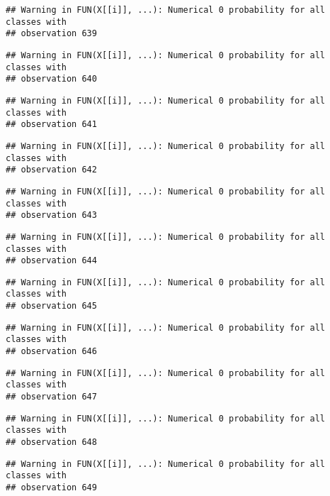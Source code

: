 \documentclass[
]{article}
\begin{document}
\begin{verbatim}
## Warning in FUN(X[[i]], ...): Numerical 0 probability for all classes with
## observation 639
\end{verbatim}

\begin{verbatim}
## Warning in FUN(X[[i]], ...): Numerical 0 probability for all classes with
## observation 640
\end{verbatim}

\begin{verbatim}
## Warning in FUN(X[[i]], ...): Numerical 0 probability for all classes with
## observation 641
\end{verbatim}

\begin{verbatim}
## Warning in FUN(X[[i]], ...): Numerical 0 probability for all classes with
## observation 642
\end{verbatim}

\begin{verbatim}
## Warning in FUN(X[[i]], ...): Numerical 0 probability for all classes with
## observation 643
\end{verbatim}

\begin{verbatim}
## Warning in FUN(X[[i]], ...): Numerical 0 probability for all classes with
## observation 644
\end{verbatim}

\begin{verbatim}
## Warning in FUN(X[[i]], ...): Numerical 0 probability for all classes with
## observation 645
\end{verbatim}

\begin{verbatim}
## Warning in FUN(X[[i]], ...): Numerical 0 probability for all classes with
## observation 646
\end{verbatim}

\begin{verbatim}
## Warning in FUN(X[[i]], ...): Numerical 0 probability for all classes with
## observation 647
\end{verbatim}

\begin{verbatim}
## Warning in FUN(X[[i]], ...): Numerical 0 probability for all classes with
## observation 648
\end{verbatim}

\begin{verbatim}
## Warning in FUN(X[[i]], ...): Numerical 0 probability for all classes with
## observation 649
\end{verbatim}
\end{document}
